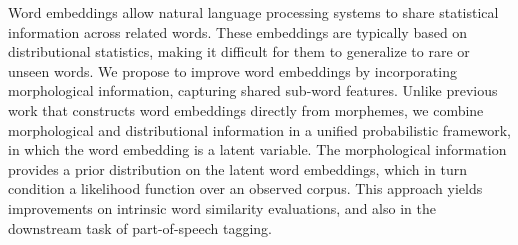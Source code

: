 Word embeddings allow natural language processing systems to share statistical information across related words. These embeddings are typically based on distributional statistics, making it difficult for them to generalize to rare or unseen words. We propose to improve word embeddings by incorporating morphological information, capturing shared sub-word features. Unlike previous work that constructs word embeddings directly from morphemes, we combine morphological and distributional information in a unified probabilistic framework, in which the word embedding is a latent variable. The morphological information provides a prior distribution on the latent word embeddings, which in turn condition a likelihood function over an observed corpus. This approach yields improvements on intrinsic word similarity evaluations, and also in the downstream task of part-of-speech tagging.

